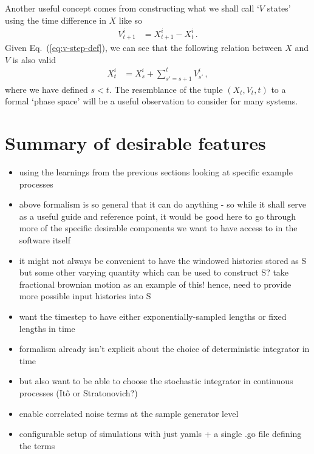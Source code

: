 \documentclass{book}
\begin{document}
Another useful concept comes from constructing what we shall call `$V$ states' using the time difference in $X$ like so
\begin{align}
V^{i}_{t+1} &= X^{i}_{t+1} - X^{i}_{t} \label{eq:v-step-def}\,.
\end{align}
Given Eq.~(\ref{eq:v-step-def}), we can see that the following relation between $X$ and $V$ is also valid
\begin{align}
X^{i}_{t} &= X_{s}^{i} + \sum_{s'=s+1}^{t}V_{s'}^{i} \label{eq:x-implicit-solution} \,,
\end{align}
where we have defined $s<t$. The resemblance of the tuple $(X_t, V_t, t)$ to a formal `phase space' will be a useful observation to consider for many systems.


\section{\sffamily Summary of desirable features}

\begin{itemize}
\item{using the learnings from the previous sections looking at specific example processes}
\item{above formalism is so general that it can do anything - so while it shall serve as a useful guide and reference point, it would be good here to go through more of the specific desirable components we want to have access to in the software itself}
\item{it might not always be convenient to have the windowed histories stored as S but some other varying quantity which can be used to construct S? take fractional brownian motion as an example of this! hence, need to provide more possible input histories into S}
\item{want the timestep to have either exponentially-sampled lengths or fixed lengths in time}
\item{formalism already isn't explicit about the choice of deterministic integrator in time}
\item{but also want to be able to choose the stochastic integrator in continuous processes (Itô or Stratonovich?)}
\item{enable correlated noise terms at the sample generator level}
\item{configurable setup of simulations with just yamls + a single .go file defining the terms}
\end{itemize}
\end{document}
